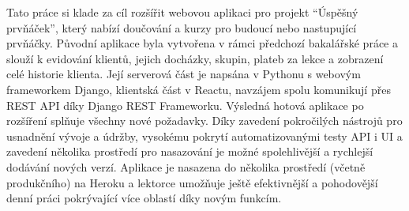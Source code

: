 Tato práce si klade za cíl rozšířit webovou aplikaci pro projekt \enquote{Úspěšný prvňáček}, který nabízí doučování a kurzy pro budoucí nebo nastupující prvňáčky. Původní aplikace byla vytvořena v rámci předchozí bakalářské práce a slouží k evidování klientů, jejich docházky, skupin, plateb za lekce a zobrazení celé historie klienta. Její serverová část je napsána v Pythonu s webovým frameworkem Django, klientská část v Reactu, navzájem spolu komunikují přes REST API díky Django REST Frameworku. Výsledná hotová aplikace po rozšíření splňuje všechny nové požadavky. Díky zavedení pokročilých nástrojů pro usnadnění vývoje a údržby, vysokému pokrytí automatizovanými testy API i UI a zavedení několika prostředí pro nasazování je možné spolehlivější a rychlejší dodávání nových verzí. Aplikace je nasazena do několika prostředí (včetně produkčního) na Heroku a lektorce umožňuje ještě efektivnější a pohodovější denní práci pokrývající více oblastí díky novým funkcím.

